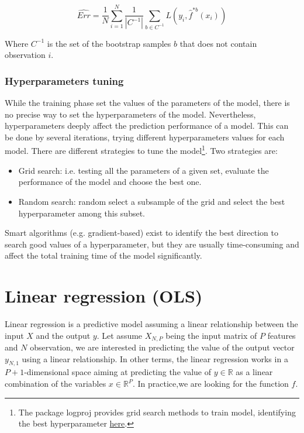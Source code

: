 \begin{equation}
\widehat{Err}=\frac{1}{N}\sum_{i=1}^{N}{\frac{1}{|C^{-1}|}\sum_{b\in C^{-1}}{L(y_i,{\hat{f}}^{\ast b}(x_i))}}
\label{eq_errCV3}
\end{equation}

Where $C^{-1}$ is the set of the bootstrap samples $b$ that does not contain observation $i$. 

\subsubsection{Hyperparameters tuning}

While the training phase set the values of the parameters of the model, there is no precise way to set the hyperparameters of the model. Nevertheless, hyperparameters deeply affect the prediction performance of a model. This can be done by several iterations, trying different hyperparameters values for each model. There are different strategies to tune the model\footnote{The package logproj provides grid search methods to train model, identifying the best hyperparameter \href{https://github.com/aletuf93/logproj/tree/master/logproj/M_learningMethod}{here}.}. Two strategies are:

\begin{itemize}
    \item Grid search: i.e. testing all the parameters of a given set, evaluate the performance of the model and choose the best one.
    \item Random search: random select a subsample of the grid and select the best hyperparameter among this subset.
\end{itemize}

Smart algorithms (e.g. gradient-based) exist to identify the best direction to search good values of a hyperparameter, but they are usually time-consuming and affect the total training time of the model significantly.

\section{Linear regression (OLS)} \label{secLinearRegression}

Linear regression is a predictive model assuming a linear relationship between the input $X$ and the output $y$. Let assume $X_{N,P}$ being the input matrix of $P$ features and $N$ observation, we are interested in predicting the value of the output vector $y_{N,1}$ using a linear relationship. In other terms, the linear regression works in a $P+1$-dimensional space aiming at predicting the value of $y\in \mathbb{R}$ as a linear combination of the variables $x\in \mathbb{R}^P$. In practice,we are looking for the function $f$.

